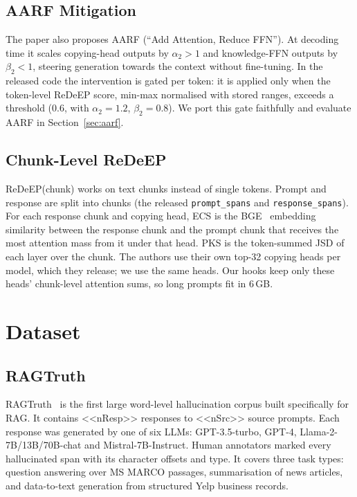 \documentclass[conference]{IEEEtran}
\begin{document}
\subsection{AARF Mitigation}
The paper also proposes AARF (``Add Attention, Reduce FFN''). At decoding time it scales copying-head outputs by $\alpha_2>1$ and knowledge-FFN outputs by $\beta_2<1$, steering generation towards the context without fine-tuning. In the released code the intervention is gated per token: it is applied only when the token-level ReDeEP score, min-max normalised with stored ranges, exceeds a threshold (0.6, with $\alpha_2=1.2$, $\beta_2=0.8$). We port this gate faithfully and evaluate AARF in Section~\ref{sec:aarf}.

\subsection{Chunk-Level ReDeEP}
ReDeEP(chunk) works on text chunks instead of single tokens. Prompt and response are split into chunks (the released \texttt{prompt\_spans} and \texttt{response\_spans}). For each response chunk and copying head, ECS is the BGE~\cite{bge} embedding similarity between the response chunk and the prompt chunk that receives the most attention mass from it under that head. PKS is the token-summed JSD of each layer over the chunk. The authors use their own top-32 copying heads per model, which they release; we use the same heads. Our hooks keep only these heads' chunk-level attention sums, so long prompts fit in 6\,GB.

\section{Dataset}
\subsection{RAGTruth}
RAGTruth~\cite{niu2024ragtruth} is the first large word-level hallucination corpus built specifically for RAG. It contains <<nResp>> responses to <<nSrc>> source prompts. Each response was generated by one of six LLMs: GPT-3.5-turbo, GPT-4, Llama-2-7B/13B/70B-chat and Mistral-7B-Instruct. Human annotators marked every hallucinated span with its character offsets and type. It covers three task types: question answering over MS MARCO passages, summarisation of news articles, and data-to-text generation from structured Yelp business records.
\end{document}
